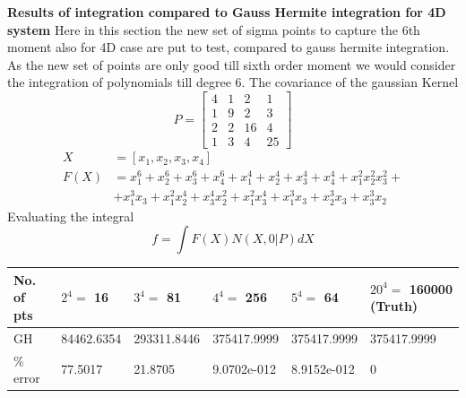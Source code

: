 \documentclass{article}
\begin{document}
 {\bf Results of integration compared to Gauss Hermite integration for 4D system}\newline\newline
Here in this section the new set of sigma points to capture the 6th moment also for 4D case are put to test, compared to gauss hermite integration. As the new set of points are only good till sixth order moment we would consider the integration of polynomials till degree 6.\newline
 The covariance of the gaussian Kernel
\[
 P = \begin{bmatrix}
       4 & 1 & 2  & 1   \\
       1 & 9 & 2  & 3   \\
       2 & 2 & 16 & 4  \\
       1 & 3 & 4 & 25  
     \end{bmatrix}
\]
\begin{align}
X&=[x_1,x_2,x_3,x_4]\\
F(X)&=x_1^6+x_2^6+x_3^6+x_4^6+x_1^4+x_2^4+x_3^4+x_4^4+x_1^2x_2^2x_3^2+\nonumber\\
&+x_1^3x_3+x_1^2x_2^4+x_3^4x_2^2+x_1^2x_3^4+x_1^3x_3+x_2^3x_3+x_3^3x_2
\end{align}
Evaluating the integral
\begin{equation}
f=\int{F(X)N(X,0|P)}dX
\end{equation}
\begin{center}
  \begin{tabular}{ | l | l | l | l | l | l | }
    \hline
       No. of pts 					& $2^4=$ 16 							& $3^4=$ 81 			  & $4^4=$ 256			 & $5^4=$ 64 	  	& $20^4=$ 160000 (Truth) \\ \hline 
      GH          					&   84462.6354  		& 293311.8446    & 375417.9999     	 & 375417.9999  		  &   375417.9999           \\ \hline
\% error        	  &   77.5017    		&  21.8705  	  	& 9.0702e-012   & 8.9152e-012   &   0                      \\ 
      \hline 
  \end{tabular}
\end{center} 
\end{document}

